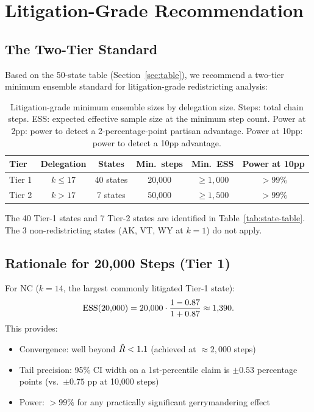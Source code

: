 \section{Litigation-Grade Recommendation}
\label{sec:litigation}

\subsection{The Two-Tier Standard}

Based on the 50-state table (Section~\ref{sec:table}), we recommend
a two-tier minimum ensemble standard for litigation-grade redistricting
analysis:

\begin{table}[h]
\centering
\caption{Litigation-grade minimum ensemble sizes by delegation size.
         Steps: total chain steps. ESS: expected effective sample size
         at the minimum step count. Power at 2pp: power to detect a
         2-percentage-point partisan advantage. Power at 10pp: power
         to detect a 10pp advantage.}
\label{tab:litigation-tiers}
\begin{tabular}{lccccc}
\toprule
Tier & Delegation & States & Min.\ steps & Min.\ ESS & Power at 10pp \\
\midrule
Tier 1 & $k \leq 17$ & 40 states & 20,000 & $\geq 1{,}000$ & $>99\%$ \\
Tier 2 & $k > 17$ & 7 states & 50,000 & $\geq 1{,}500$ & $>99\%$ \\
\bottomrule
\end{tabular}
\end{table}

The 40 Tier-1 states and 7 Tier-2 states are identified in Table~\ref{tab:state-table}.
The 3 non-redistricting states (AK, VT, WY at $k = 1$) do not apply.

\subsection{Rationale for 20,000 Steps (Tier 1)}

For NC ($k = 14$, the largest commonly litigated Tier-1 state):
\[
  \mathrm{ESS}(20{,}000) = 20{,}000 \cdot \frac{1 - 0.87}{1 + 0.87} \approx 1{,}390.
\]
This provides:
\begin{itemize}
\item Convergence: well beyond $\hat{R} < 1.1$ (achieved at $\approx 2{,}000$ steps)
\item Tail precision: 95\% CI width on a 1st-percentile claim is
  $\pm 0.53$ percentage points (vs.\ $\pm 0.75$ pp at 10,000 steps)
\item Power: $>99\%$ for any practically significant gerrymandering effect
\end{itemize}

